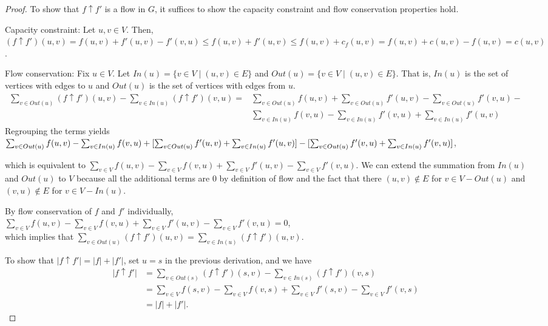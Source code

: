 \begin{proof}
    To show that $f \uparrow f'$ is a flow in $G$, it suffices to show the capacity constraint and flow conservation properties hold.

    Capacity constraint: Let $u,v \in V$. Then, \\ $(f \uparrow f')(u,v)=f(u,v)+f'(u,v)-f'(v,u) \leq f(u,v) + f'(u,v) \leq f(u,v) + c_f(u,v) = f(u,v) + c(u,v) - f(u,v) = c(u,v)$.

    Flow conservation: Fix $u \in V$. Let $In(u) = \{v \in V \mid (u,v) \in E\}$ and $Out(u) = \{v \in V \mid (u,v) \in E\}$. That is, $In(u)$ is the set of vertices with edges to $u$ and $Out(u)$ is the set of vertices with edges from $u$.
    $$
    \begin{aligned}
        \sum_{v \in Out(u)} (f \uparrow f')(u,v) - \sum_{v \in In(u)} (f \uparrow f')(v,u) =&
        \sum_{v \in Out(u)} f(u,v) + \sum_{v \in Out(u)} f'(u,v) - \sum_{v \in Out(u)} f'(v,u) - \\
        & \sum_{v \in In(u)} f(v,u) - \sum_{v \in In(u)} f'(v,u) + \sum_{v \in In(u)} f'(u,v)
    \end{aligned}
    $$
    Regrouping the terms yields \\ $\sum_{v \in Out(u)} f(u,v) - \sum_{v \in In(u)} f(v,u) + [\sum_{v \in Out(u)} f'(u,v) + \sum_{v \in In(u)} f'(u,v) ] \\ - [ \sum_{v \in Out(u)} f'(v,u) + \sum_{v \in In(u)} f'(v,u) ]$,
    
    which is equivalent to $\sum_{v \in V} f(u,v) - \sum_{v \in V} f(v,u) + \sum_{v \in V} f'(u,v) - \sum_{v \in V} f'(v,u)$. We can extend the summation from $In(u)$ and $Out(u)$ to $V$ because all the additional terms are 0 by definition of flow and the fact that there $(u,v) \not\in E$ for $v \in V-Out(u)$ and $(v,u) \not\in E$ for $v \in V-In(u)$.

    By flow conservation of $f$ and $f'$ individually, \\
    $\sum_{v \in V} f(u,v) - \sum_{v \in V} f(v,u) + \sum_{v \in V} f'(u,v) - \sum_{v \in V} f'(v,u) = 0$, \\
    which implies that $\sum_{v \in Out(u)} (f \uparrow f')(u,v) = \sum_{v \in In(u)} (f \uparrow f')(u,v)$.

    To show that $|f \uparrow f'| = |f| + |f'|$, set $u = s$ in the previous derivation, and we have
    $$
    \begin{aligned}
        |f \uparrow f'| &= \sum_{v \in Out(s)} (f \uparrow f')(s,v) - \sum_{v \in In(s)} (f \uparrow f')(v,s) \\
        &= \sum_{v \in V} f(s,v) - \sum_{v \in V} f(v,s) + \sum_{v \in V} f'(s,v) - \sum_{v \in V} f'(v,s) \\
        &= |f| + |f'|.
    \end{aligned}
    $$
\end{proof}

